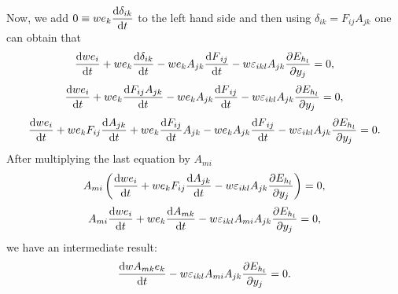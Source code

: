 \documentclass[twoside]{article}
\newcommand{\ted}{E} %
\newcommand{\pd}{\partial}
\newcommand{\rmd}{{\rm d}}
\begin{document}
Now, we add \(0\equiv w e_k \dfrac{\rmd\delta_{ik}}{\rmd t}\) to the left hand 
side and then using \(\delta _{ik}=F_{ij}A_{jk}\) one can obtain that
\begin{equation}
\frac{\rmd w e_i}{{\rmd t}}+w e_k\frac{\rmd \delta_{ik}}{ \rmd t}-w e_k 
A_{{jk}}\frac{{\rmd F}_{{ij}}}{{\rmd t}}-w
\varepsilon _{{ikl}}A_{{jk}}\frac{\pd \ted_{h_l}}{\pd  y_j}=0,
\end{equation}
\begin{equation}
\frac{\rmd w e_i}{{\rmd t}}+w e_k\frac{\rmd F_{{ij}}A_{{jk}}}{{\rmd t}}-w e_k 
A_{{jk}}\frac{{\rmd F}_{{ij}}}{{\rmd t}}-w \varepsilon 
_{{ikl}}A_{{jk}}\frac{\pd \ted_{h_l}}{\pd  y_j}=0,
\end{equation}
\begin{equation}
\frac{\rmd w e_i}{{\rmd t}}+w e_kF_{{ij}}\frac{\rmd A_{{jk}}}{{\rmd t}}+w 
e_k\frac{\rmd F_{{ij}}}{{\rmd t}}A_{{jk}}-w e_k A_{{jk}}\frac{{\rmd 
F}_{{ij}}}{{\rmd t}}-w \varepsilon _{{ikl}}A_{{jk}}\frac{\pd 
\ted_{h_l}}{\pd  y_j}=0.
\end{equation}
After multiplying the last equation by $ A_{mi} $
\begin{equation}
A_{{mi}}\left(\frac{\rmd w e_i}{{\rmd t}}+w e_kF_{{ij}}\frac{\rmd 
A_{{jk}}}{{\rmd t}}-w \varepsilon _{{ikl}}A_{{jk}}\frac{\pd 
\ted_{h_l}}{\pd  y_j}\right)=0,
\end{equation}
\begin{equation}
A_{{mi}}\frac{\rmd w e_i}{{\rmd t}}+w e_k\frac{\rmd A_{{mk}}}{{\rmd t}}-w 
\varepsilon _{{ikl}}A_{{mi}}A_{{jk}}\frac{\pd \ted_{h_l}}{\pd  y_j}=0,
\end{equation}
we have an intermediate result:
\begin{equation}\label{eq.inter.result}
\frac{\rmd w A_{{mk}} e_k}{{\rmd t}}-w \varepsilon 
_{{ikl}}A_{{mi}}A_{{jk}}\frac{\pd \ted_{h_l}}{\pd
 y_j}=0.
\end{equation}
\end{document}
